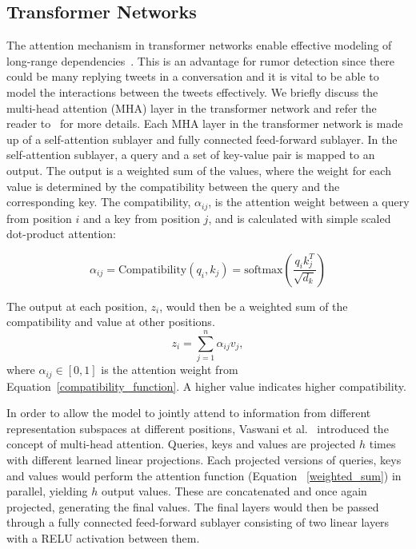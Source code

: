 \documentclass[letterpaper]{article} %
\begin{document}
\subsection{Transformer Networks}
The attention mechanism in transformer networks enable effective modeling of long-range dependencies~\cite{DBLP:journals/corr/VaswaniSPUJGKP17}.
This is an advantage for rumor detection since there could be many replying tweets in a conversation and it is vital to be able to model the interactions between the tweets effectively. We briefly discuss the multi-head attention (MHA) layer in the transformer network and refer the reader to~\cite{DBLP:journals/corr/VaswaniSPUJGKP17} for more details. 
Each MHA layer in the transformer network is made up of a self-attention sublayer and fully connected feed-forward sublayer.
In the self-attention sublayer, a query and a set of key-value pair is mapped to an output. The output is a weighted sum of the values, where the weight for each value is determined by the compatibility between the query and the corresponding key. The compatibility, $\alpha_{ij}$, is the attention weight between a query from position $i$ and a key from position $j$, and is calculated with simple scaled dot-product attention: 

\begin{equation}
\alpha_{ij} = \mathrm{Compatibility}(q_{i}, k_{j}) = \mathrm{softmax}(\frac{q_{i}k_{j}^T}{\sqrt{d_{k}}}) \label{compatibility_function}
\end{equation}

The output at each position, $z_i$, would then be a weighted sum of the compatibility and value at other positions. 
\begin{equation}
z_i = \sum_{j=1}^{n} \alpha_{ij} v_j, \label{weighted_sum}
\end{equation}
where $\alpha_{ij} \in [0,1]$ is the attention weight from Equation~\ref{compatibility_function}. A higher value indicates higher compatibility. 

In order to allow the model to jointly attend to information from different representation subspaces at different positions, Vaswani et al.~ introduced the concept of multi-head attention. Queries, keys and values are projected $h$ times with different learned linear projections. Each projected versions of queries, keys and values would perform the attention function (Equation ~\ref{weighted_sum}) in parallel, yielding $h$ output values. These are concatenated and once again projected, generating the final values. The final layers would then be passed through a fully connected feed-forward sublayer consisting of two linear layers with a RELU activation between them. 
\end{document}
